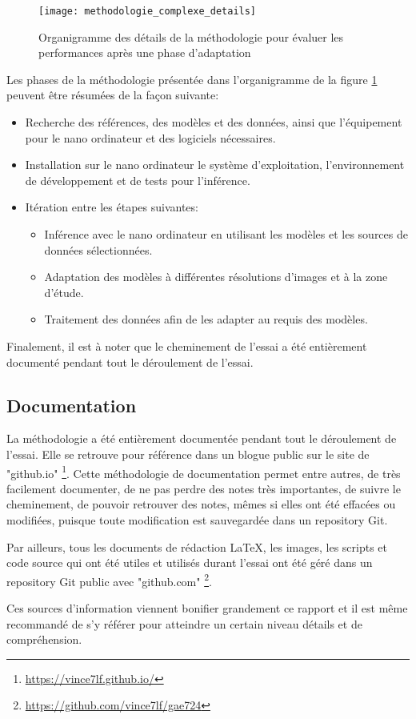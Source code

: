 \label{methodologie_complexe_details}
\begin{figure}[H]
    \centering
    \texttt{[image: methodologie\_complexe\_details]}
    \caption{Organigramme des détails de la méthodologie pour évaluer les performances après une phase d'adaptation}
    \label{fig:methodologie_complexe_details}
\end{figure}
\par Les phases de la méthodologie présentée dans l'organigramme de la figure \ref{fig:methodologie_complexe_details} peuvent être résumées de la façon suivante:
\begin{itemize}
   \item Recherche des références, des modèles et des données, ainsi que l'équipement pour le nano ordinateur et des logiciels nécessaires.
   \item Installation sur le nano ordinateur le système d'exploitation, l'environnement de développement et de tests pour l'inférence.
   \item Itération entre les étapes suivantes:
   \begin{itemize}
      \item Inférence avec le nano ordinateur en utilisant les modèles et les sources de données sélectionnées.
      \item Adaptation des modèles à différentes résolutions d'images et à la zone d'étude.
      \item Traitement des données afin de les adapter au requis des modèles.
   \end{itemize}
\end{itemize}
\par Finalement, il est à noter  que le cheminement de l'essai a été entièrement documenté pendant tout le déroulement de l'essai.
\subsection{Documentation}
\par La méthodologie a été entièrement documentée pendant tout le déroulement de l'essai. Elle se retrouve pour référence dans un blogue public sur le site de "github.io" \footnote{\url{https://vince7lf.github.io/}}. Cette méthodologie de documentation permet entre autres, de très facilement documenter, de ne pas perdre des notes très importantes, de suivre le cheminement, de pouvoir retrouver des notes, mêmes si elles ont été effacées ou modifiées, puisque toute modification est sauvegardée dans un repository Git.
\par Par ailleurs, tous les documents de rédaction LaTeX, les images, les scripts et code source qui ont été utiles et utilisés durant l'essai ont été géré dans un repository Git public avec "github.com" \footnote{\url{https://github.com/vince7lf/gae724}}. 
\par Ces sources d'information viennent bonifier grandement ce rapport et il est même recommandé de s'y référer pour atteindre un certain niveau détails et de compréhension. 
